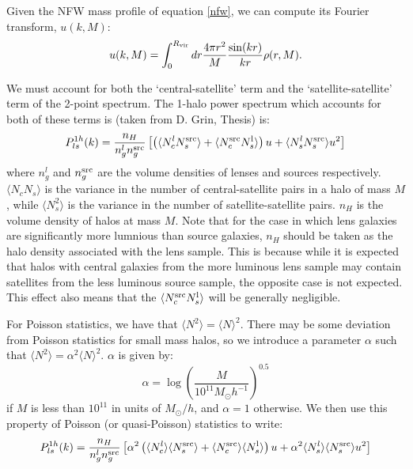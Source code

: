 \documentclass[onecolumn,amsmath,aps,fleqn, superscriptaddress]{revtex4}
\begin{document}
Given the NFW mass profile of equation \ref{nfw}, we can compute its Fourier transform, $u(k, M)$:
\begin{equation}
u(k, M) = \int_0^{R_{\rm vir}} dr \frac{4 \pi r^2}{M}\frac{\sin(kr)}{kr}\rho(r, M).
\label{u}
\end{equation}

We must account for both the `central-satellite' term and the `satellite-satellite' term of the 2-point spectrum. The 1-halo power spectrum which accounts for both of these terms is (taken from D. Grin, Thesis) is:
\begin{equation}
P_{ls}^{1h}(k) = \frac{n_H}{n_g^l n_g^{\rm src}}\left[\left(\langle N_c^l N_s^{\rm src} \rangle + \langle N_c^{\rm src} N_s^{\rm l} \rangle \right) u + \langle N_s^l N_s^{\rm src} \rangle u^2\right]
\label{1hpgg}
\end{equation}
where $n_g^l$ and $n_g^{\rm src}$ are the volume densities of lenses and sources respectively. $\langle N_c N_s \rangle$ is the variance in the number of central-satellite pairs in a halo of mass $M$, while $\langle N_s^2 \rangle$ is the variance in the number of satellite-satellite pairs. $n_H$ is the volume density of halos at mass $M$. Note that for the case in which lens galaxies are significantly more lumnious than source galaxies, $n_H$ should be taken as the halo density associated with the lens sample. This is because while it is expected that halos with central galaxies from the more luminous lens sample may contain satellites from the less luminous source sample, the opposite case is not expected. This effect also means that the $\langle N_c^{\rm src} N_s^{\rm l} \rangle$ will be generally negligible.

For Poisson statistics, we have that $\langle N^2 \rangle = \langle N \rangle^2$. There may be some deviation from Poisson statistics for small mass halos, so we introduce a parameter $\alpha$ such that $\langle N^2 \rangle = \alpha^2\langle N \rangle^2$. $\alpha$ is given by:
\begin{equation}
\alpha = \log\left(\frac{M}{10^{11}M_\odot h^{-1}}\right)^{0.5}
\label{alpha}
\end{equation}
if $M$ is less than $10^{11}$ in units of $M_\odot / h$, and $\alpha=1$ otherwise. We then use this property of Poisson (or quasi-Poisson) statistics to write:
\begin{equation}
P_{ls}^{1h}(k) = \frac{n_H}{n_g^l n_g^{\rm src}}\left[\alpha^2 \left(\langle N_c^l \rangle \langle N_s^{\rm src} \rangle + \langle N_c^{\rm src}\rangle \langle N_s^{\rm l} \rangle\right) u + \alpha^2\langle N_s^l \rangle \langle N_s^{\rm src} \rangle u^2\right]
\label{1hpgg_Pois}
\end{equation}
\end{document}
